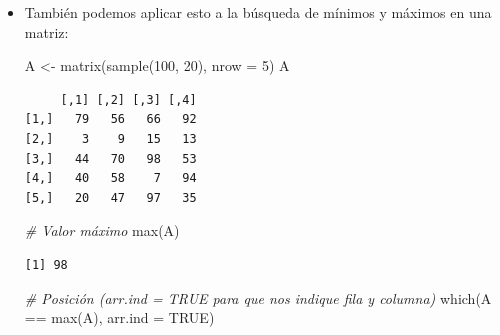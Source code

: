 \documentclass[
]{book}
\newenvironment{Shaded}{\begin{snugshade}}{\end{snugshade}}
\newcommand{\AttributeTok}[1]{\textcolor[rgb]{0.77,0.63,0.00}{#1}}
\newcommand{\CommentTok}[1]{\textcolor[rgb]{0.56,0.35,0.01}{\textit{#1}}}
\newcommand{\ConstantTok}[1]{\textcolor[rgb]{0.00,0.00,0.00}{#1}}
\newcommand{\DecValTok}[1]{\textcolor[rgb]{0.00,0.00,0.81}{#1}}
\newcommand{\FunctionTok}[1]{\textcolor[rgb]{0.00,0.00,0.00}{#1}}
\newcommand{\NormalTok}[1]{#1}
\newcommand{\OtherTok}[1]{\textcolor[rgb]{0.56,0.35,0.01}{#1}}
\newcommand{\SpecialCharTok}[1]{\textcolor[rgb]{0.00,0.00,0.00}{#1}}
\begin{document}
\begin{itemize}
\begin{verbatim}
[1] 2
\end{verbatim}

\begin{Shaded}
\begin{Highlighting}[]
\CommentTok{\# Pero podemos obtener todas las posiciones así:}
\FunctionTok{which}\NormalTok{(w }\SpecialCharTok{==} \FunctionTok{max}\NormalTok{(w))}
\end{Highlighting}
\end{Shaded}

\begin{verbatim}
[1] 2 5
\end{verbatim}
\item
  También podemos aplicar esto a la búsqueda de mínimos y máximos en una matriz:

\begin{Shaded}
\begin{Highlighting}[]
\NormalTok{A }\OtherTok{\textless{}{-}} \FunctionTok{matrix}\NormalTok{(}\FunctionTok{sample}\NormalTok{(}\DecValTok{100}\NormalTok{, }\DecValTok{20}\NormalTok{), }\AttributeTok{nrow =} \DecValTok{5}\NormalTok{)}
\NormalTok{A}
\end{Highlighting}
\end{Shaded}

\begin{verbatim}
     [,1] [,2] [,3] [,4]
[1,]   79   56   66   92
[2,]    3    9   15   13
[3,]   44   70   98   53
[4,]   40   58    7   94
[5,]   20   47   97   35
\end{verbatim}

\begin{Shaded}
\begin{Highlighting}[]
\CommentTok{\# Valor máximo}
\FunctionTok{max}\NormalTok{(A)}
\end{Highlighting}
\end{Shaded}

\begin{verbatim}
[1] 98
\end{verbatim}

\begin{Shaded}
\begin{Highlighting}[]
\CommentTok{\# Posición (arr.ind = TRUE para que nos indique fila y columna)}
\FunctionTok{which}\NormalTok{(A }\SpecialCharTok{==} \FunctionTok{max}\NormalTok{(A), }\AttributeTok{arr.ind =} \ConstantTok{TRUE}\NormalTok{)}
\end{Highlighting}
\end{Shaded}


\end{itemize}
\end{document}

